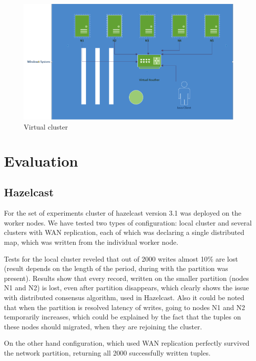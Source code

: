 \documentclass[a4paper]{article}
\begin{document}
\begin{figure}[h!]
	\centering
	\includegraphics[width=\textwidth]{cluster}
	\caption{Virtual cluster}
	\label{fig:cluster}
\end{figure}

\section{Evaluation}

\subsection{Hazelcast}

For the set of experiments cluster of hazelcast version 3.1 was deployed on the worker nodes. 
We have tested two types of configuration: local cluster and several clusters with WAN replication, each of which was declaring a single distributed map, which was written from the individual worker node.

Tests for the local cluster reveled that out of 2000 writes almost 10\% are lost (result depends on the length of the period, during with the partition was present).
Results show that every record, written on the smaller partition (nodes N1 and N2) is lost, even after partition disappears, which clearly shows the issue with distributed consensus algorithm, used in Hazelcast.
Also it could be noted that when the partition is resolved latency of writes, going to nodes N1 and N2 temporarily increases, which could be explained by the fact that the tuples on these nodes should migrated, when they are rejoining the cluster.

On the other hand configuration, which used WAN replication perfectly survived the network partition, returning all 2000 successfully written tuples.
\end{document}
